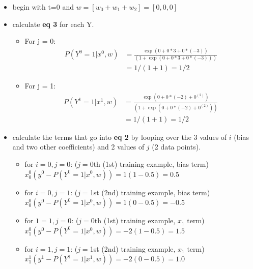 \begin{itemize}
	\item begin with t=0 and $w = [w_0 + w_1 + w_2] = [0, 0, 0]$
	\item calculate \textbf{eq 3} for each Y.  
		\begin{itemize}
			\item For j = 0:  
				\begin{align*}
					P(Y^0 = 1 | x^0, w) &= \frac{\exp(0 + 0*3 + 0*(-3))}{(1 +  \exp(0 + 0*3 + 0*(-3)))} \\
						&= 1/(1+1) = 1/2
				\end{align*}
			\item For j = 1:  
				\begin{align*}
					P(Y^1 = 1 | x^1, w) &= \frac{\exp(0 + 0*(-2) + 0^(2))}{(1 +  \exp(0 +  0*(-2) + 0^(2)))} \\
						&= 1/(1+1) = 1/2
				\end{align*}
		\end{itemize} 
	\item calculate the terms that go into \textbf{eq 2} by looping over the 3 values of $i$ (bias and two other coefficients) and 2 values of $j$ (2 data points).  
		\begin{itemize}
			\item for $i=0, j=0$: ($j=$0th (1st) training example, bias term) \hfill \\
				 $x_0^0(y^0 - P(Y^0=1|x^0, w)) = 1(1-0.5) = 0.5$ 
			\item for $i=0, j=1$: ($j=$1st (2nd) training example, bias term) \hfill \\
				 $x_0^0(y^0 - P(Y^0=1|x^0, w)) = 1(0-0.5) = -0.5$ 
			
			\item for $1=1, j=0$: ($j=$0th (1st) training example, $x_1$ term) \hfill \\
				 $x_1^0(y^0 - P(Y^0=1|x^0, w)) = -2(1-0.5) = 1.5$ 
			\item for $i=1, j=1$: ($j=$1st (2nd) training example, $x_1$ term) \hfill \\
				 $x_1^1(y^1 - P(Y^1=1|x^1, w)) = -2(0-0.5) = 1.0$ 
				 

\end{itemize}
\end{itemize}

